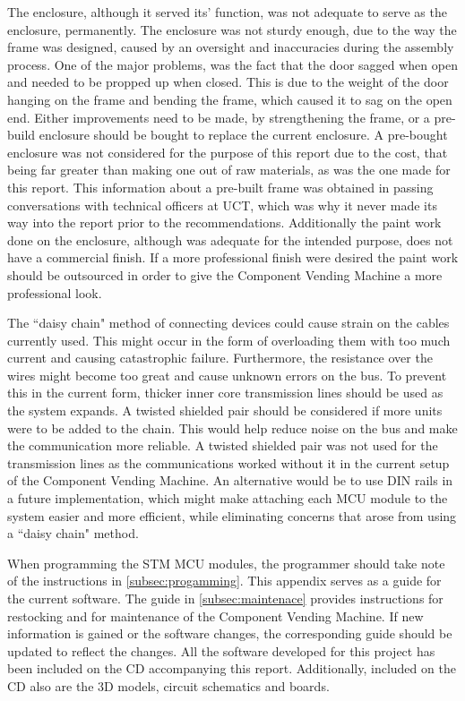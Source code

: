 \documentclass[a4paper,11pt]{article}
\numberwithin{figure}{section}
\numberwithin{table}{section}
\begin{document}
The enclosure, although it served its' function, was not adequate to serve as the enclosure, permanently. The enclosure was not sturdy enough, due to the way the frame was designed, caused by an oversight and inaccuracies during the assembly process. One of the major problems, was the fact that the door sagged when open and needed to be propped up when closed. This is due to the weight of the door hanging on the frame and bending the frame, which caused it to sag on the open end. Either improvements need to be made, by strengthening the frame, or a pre-build enclosure should be bought to replace the current enclosure. A pre-bought enclosure was not considered for the purpose of this report due to the cost, that being far greater than making one out of raw materials, as was the one made for this report. This information about a pre-built frame was obtained in passing conversations with technical officers at UCT, which was why it never made its way into the report prior to the recommendations. Additionally the paint work done on the enclosure, although was adequate for the intended purpose, does not have a commercial finish. If a more professional finish were desired the paint work should be outsourced in order to give the Component Vending Machine a more professional look.

The ``daisy chain" method of connecting devices could cause strain on the cables currently used. This might occur in the form of overloading them with too much current and causing catastrophic failure. Furthermore, the resistance over the wires might become too great and cause unknown errors on the bus. To prevent this in the current form, thicker inner core transmission lines should be used as the system expands. A twisted shielded pair should be considered if more units were to be added to the chain. This would help reduce noise on the bus and make the communication more reliable. A twisted shielded pair was not used for the transmission lines as the communications worked without it in the current setup of the Component Vending Machine. An alternative would be to use DIN rails in a future implementation, which might make attaching each MCU module to the system easier and more efficient, while eliminating concerns that arose from using a ``daisy chain" method.

When programming the STM MCU modules, the programmer should take note of the instructions in \autoref{subsec:progamming}. This appendix serves as a guide for the current software. The guide in \autoref{subsec:maintenace} provides instructions for restocking and for maintenance of the Component Vending Machine. If new information is gained or the software changes, the corresponding guide should be updated to reflect the changes. All the software developed for this project has been included on the CD accompanying this report. Additionally, included on the CD also are the 3D models, circuit schematics and boards.
\end{document}
